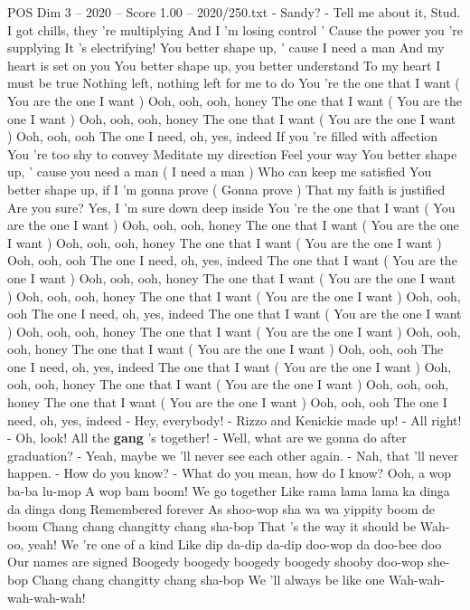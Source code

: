 \begin{textsample}{POS Dim 3 – 2020 – Score 1.00 – 2020/250.txt}  \label{ex:f3_pos_018}
- Sandy? - Tell me about it, Stud.
I got chills, they 're multiplying And I 'm losing control ' Cause the power you 're supplying It 's electrifying!
You better shape up, ' cause I need a man And my heart is set on you You better shape up, you better understand To my heart I must be true Nothing left, nothing left for me to do You 're the one that I want ( You are the one I want ) Ooh, ooh, ooh, honey The one that I want ( You are the one I want ) Ooh, ooh, ooh, honey The one that I want ( You are the one I want ) Ooh, ooh, ooh The one I need, oh, yes, indeed If you 're filled with affection You 're too shy to convey Meditate my direction Feel your way You better shape up, ' cause you need a man ( I need a man ) Who can keep me satisfied You better shape up, if I 'm gonna prove ( Gonna prove ) That my faith is justified Are you sure?
Yes, I 'm sure down deep inside You 're the one that I want ( You are the one I want ) Ooh, ooh, ooh, honey The one that I want ( You are the one I want ) Ooh, ooh, ooh, honey The one that I want ( You are the one I want ) Ooh, ooh, ooh The one I need, oh, yes, indeed The one that I want ( You are the one I want ) Ooh, ooh, ooh, honey The one that I want ( You are the one I want ) Ooh, ooh, ooh, honey The one that I want ( You are the one I want ) Ooh, ooh, ooh The one I need, oh, yes, indeed The one that I want ( You are the one I want ) Ooh, ooh, ooh, honey The one that I want ( You are the one I want ) Ooh, ooh, ooh, honey The one that I want ( You are the one I want ) Ooh, ooh, ooh The one I need, oh, yes, indeed The one that I want ( You are the one I want ) Ooh, ooh, ooh, honey The one that I want ( You are the one I want ) Ooh, ooh, ooh, honey The one that I want ( You are the one I want ) Ooh, ooh, ooh The one I need, oh, yes, indeed - Hey, everybody! - Rizzo and Kenickie made up! - All right! - Oh, look!
All the \textbf{gang} 's together! - Well, what are we gonna do after graduation? - Yeah, maybe we 'll never see each other again. - Nah, that 'll never happen. - How do you know? - What do you mean, how do I know?
Ooh, a wop ba-ba lu-mop A wop bam boom!
We go together Like rama lama lama ka dinga da dinga dong Remembered forever As shoo-wop sha wa wa yippity boom de boom Chang chang changitty chang sha-bop That 's the way it should be Wah-oo, yeah!
We 're one of a kind Like dip da-dip da-dip doo-wop da doo-bee doo Our names are signed Boogedy boogedy boogedy boogedy shooby doo-wop she-bop Chang chang changitty chang sha-bop We 'll always be like one Wah-wah-wah-wah-wah!

\end{textsample}
